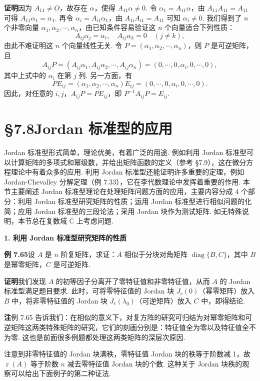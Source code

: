 \documentclass[UTF8,12pt,a4paper,fontset=fandol]{ctexart}
\begin{document}
\noindent\textbf{证明}\quad 因为 $A_{11}\ne O$，故存在 $\alpha$，使得 $A_{11}\alpha\ne0$. 令 $\alpha_1=A_{11}\alpha$，由 $A_{11}A_{11}=A_{11}$ 可得 $A_{11}\alpha_1=\alpha_1$. 再令 $\alpha_i=A_{i1}\alpha_1$，由 $A_{1i}A_{i1}=A_{11}$ 可知 $\alpha_i\ne0$. 我们得到了 $n$ 个非零向量 $\alpha_1,\alpha_2,\cdots,\alpha_n$，由已知条件容易验证这 $n$ 个向量适合下列性质：
\[
A_{ij}\alpha_j=\alpha_i,\quad A_{ij}\alpha_k=0\quad (j\ne k),
\]
由此不难证明这 $n$ 个向量线性无关. 令 $P=(\alpha_1,\alpha_2,\cdots,\alpha_n)$，则 $P$ 是可逆矩阵，且
\[
A_{ij}P=(A_{ij}\alpha_1,A_{ij}\alpha_2,\cdots,A_{ij}\alpha_n)=(0,\cdots,0,\alpha_i,0,\cdots,0),
\]
其中上式中的 $\alpha_i$ 在第 $j$ 列. 另一方面，有
\[
PE_{ij}=(\alpha_1,\alpha_2,\cdots,\alpha_n)E_{ij}=(0,\cdots,0,\alpha_i,0,\cdots,0).
\]
因此，对任意的 $i,j$，$A_{ij}P=PE_{ij}$，即 $P^{-1}A_{ij}P=E_{ij}$.

\section*{§7.8\quad Jordan 标准型的应用}

Jordan 标准型形式简单，理论优美，有着广泛的用途. 例如利用 Jordan 标准型可以计算矩阵的多项式和幂级数，并给出矩阵函数的定义（参考 §7.9），这在微分方程理论中有着众多的应用. 利用 Jordan 标准型还能证明许多重要的定理，例如 Jordan-Chevalley 分解定理（例 7.33），它在李代数理论中发挥着重要的作用. 本节主要阐述 Jordan 标准型理论在处理矩阵问题方面的应用，主要内容分成 4 个部分：利用 Jordan 标准型研究矩阵的性质；运用 Jordan 标准型进行相似问题的化简；应用 Jordan 标准型的三段论法；采用 Jordan 块作为测试矩阵. 如无特殊说明，本节总在复数域 $\mathbb{C}$ 上考虑问题.

\noindent\textbf{1. 利用 Jordan 标准型研究矩阵的性质}

\noindent\textbf{例 7.65}\quad 设 $A$ 是 $n$ 阶复矩阵，求证：$A$ 相似于分块对角矩阵 $\operatorname{diag}\{B,C\}$，其中 $B$ 是幂零矩阵，$C$ 是可逆矩阵.

\noindent\textbf{证明}\quad 我们发现 $A$ 的初等因子分离开了零特征值和非零特征值，从而 $A$ 的 Jordan 标准型满足题目要求. 此时，可将零特征值的 Jordan 块 $J_r(0)$（幂零矩阵）放入 $B$ 中，将非零特征值的 Jordan 块 $J_r(\lambda_0)$（可逆矩阵）放入 $C$ 中，即得结论.

\noindent\textbf{注}\quad 例 7.65 告诉我们：在相似的意义下，对复方阵的研究可归结为对幂零矩阵和可逆矩阵这两类特殊矩阵的研究，它们的刻画分别是：特征值全为零以及特征值全不为零. 这也是前面很多例题都处理这两类矩阵的深层次原因.

注意到非零特征值的 Jordan 块满秩，零特征值 Jordan 块的秩等于阶数减 1，故 $\operatorname{r}(A)$ 等于阶数 $n$ 减去零特征值 Jordan 块的个数. 这种关于 Jordan 块秩的观察可以给出下面例子的第二种证法.
\end{document}
